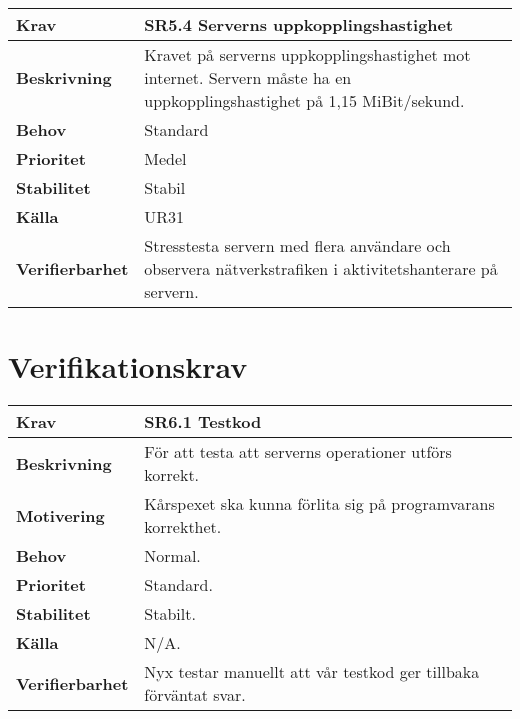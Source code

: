 \documentclass[a4paper, twoside, 11pt, titlepage]{article}
\begin{document}
\begin{tabular} { p{2.6cm} p{12.5cm} }
	\hline
	\sffamily\textbf{Krav} & \sffamily\textbf{SR5.4 Serverns uppkopplingshastighet } \\
	\hline
	\sffamily\textbf{Beskrivning} & Kravet på serverns uppkopplingshastighet mot internet. Servern måste ha en uppkopplingshastighet på 1,15 MiBit/sekund.  \\
	\hline
	\sffamily\textbf{Behov} & Standard  \\
	\hline
	\sffamily\textbf{Prioritet} & Medel  \\
	\hline
	\sffamily\textbf{Stabilitet} & Stabil  \\
	\hline
	\sffamily\textbf{Källa} & UR31  \\
	\hline
	\sffamily\textbf{Verifierbarhet} & Stresstesta servern med flera användare och observera nätverkstrafiken i aktivitetshanterare på servern.  \\
	\hline
\end{tabular}


\clearpage
\section{Verifikationskrav}


\begin{tabular} { p{2.6cm} p{12.5cm} }
	\hline
	\sffamily\textbf{Krav} & \sffamily\textbf{SR6.1 Testkod } \\
	\hline
	\sffamily\textbf{Beskrivning} &  För att testa att serverns operationer utförs korrekt.  \\
	\hline
	\sffamily\textbf{Motivering} & Kårspexet ska kunna förlita sig på programvarans korrekthet.  \\
	\hline
	\sffamily\textbf{Behov} &  Normal.  \\
	\hline
	\sffamily\textbf{Prioritet} &  Standard.  \\
	\hline
	\sffamily\textbf{Stabilitet} &  Stabilt.  \\
	\hline
	\sffamily\textbf{Källa} &  N/A.  \\
	\hline
	\sffamily\textbf{Verifierbarhet} &  Nyx testar manuellt att vår testkod ger tillbaka förväntat svar.  \\
	\hline
\end{tabular}
\vspace{6mm}
\end{document}
